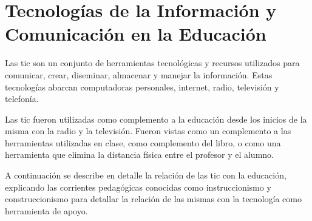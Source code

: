 \chapter[TIC's en la Educación]{Tecnologías de la Información y Comunicación en
    la Educación}
\label{chap:tics}


Las \Gls{tic} son un conjunto de herramientas tecnológicas y recursos utilizados
para comunicar, crear, diseminar, almacenar y manejar la
información\cite{unesco:ict}. Estas tecnologías abarcan computadoras personales,
internet, radio, televisión y telefonía\cite{tinio:ict}.

Las \Gls{tic} fueron utilizadas como complemento a la educación desde los
inicios de la misma con la radio y la televisión. Fueron vistas como un
complemento a las herramientas utilizadas en clase, como complemento del libro,
o como una herramienta que elimina la distancia física entre el profesor y el
alumno\cite{unesco:ict}. 

A continuación se describe en detalle la relación de las  \Gls{tic} con la
educación, explicando las corrientes pedagógicas conocidas como instruccionismo
y construccionismo para detallar la relación de las mismas con la tecnología
como herramienta de apoyo.





